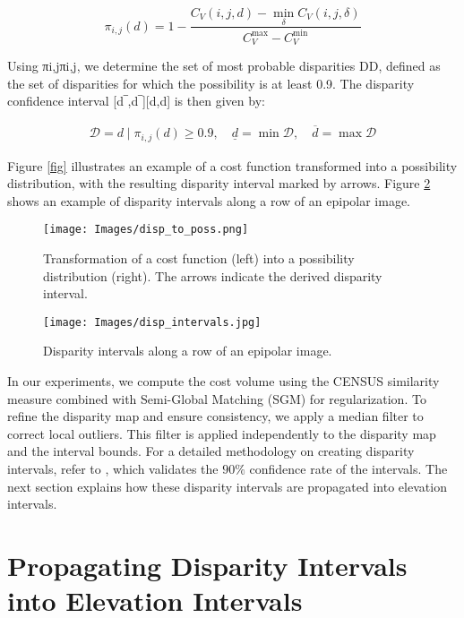 \begin{equation}
\pi_{i,j}(d) = 1 - \frac{C_V(i,j,d) - \min_{\delta} C_V(i,j,\delta)}{C_V^{\max} - C_V^{\min}}
\end{equation}

Using πi,jπi,j​, we determine the set of most probable disparities DD, defined as the set of disparities for which the possibility is at least 0.9. The disparity confidence interval [d‾,d‾][d​,d] is then given by:

\begin{eqnarray}
\mathcal{D} = { d \mid \pi_{i,j}(d) \geq 0.9 }, \quad \underline{d} = \min \mathcal{D}, \quad \overline{d} = \max \mathcal{D}
\end{eqnarray}

Figure \ref{fig} illustrates an example of a cost function transformed into a possibility distribution, with the resulting disparity interval marked by arrows. Figure \ref{fig
} shows an example of disparity intervals along a row of an epipolar image.

\begin{figure}[htb]
\texttt{[image: Images/disp\_to\_poss.png]}
\caption{Transformation of a cost function (left) into a possibility distribution (right). The arrows indicate the derived disparity interval.}
\label{fig
}
\end{figure}

\begin{figure}[htb]
\texttt{[image: Images/disp\_intervals.jpg]}
\caption{Disparity intervals along a row of an epipolar image.}
\label{fig
}
\end{figure}

In our experiments, we compute the cost volume using the CENSUS similarity measure combined with Semi-Global Matching (SGM) for regularization. To refine the disparity map and ensure consistency, we apply a median filter to correct local outliers. This filter is applied independently to the disparity map and the interval bounds. For a detailed methodology on creating disparity intervals, refer to \cite{malinowski_robust_2024}, which validates the $90\%$ confidence rate of the intervals. The next section explains how these disparity intervals are propagated into elevation intervals.

\section{Propagating Disparity Intervals into Elevation Intervals}

